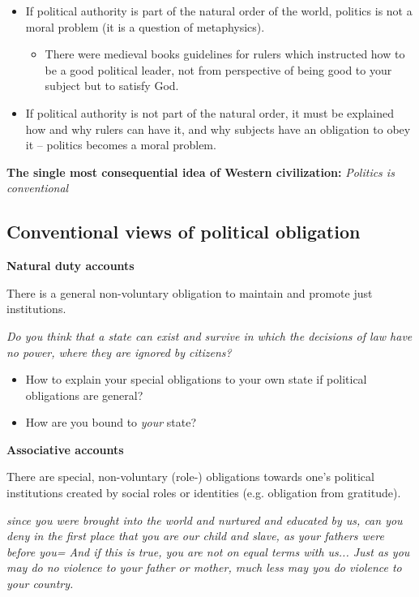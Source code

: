 \begin{itemize}
    \item If political authority is part of the natural order of the world,
    politics is not a moral problem (it is a question of metaphysics).
    \begin{itemize}
        \item There were medieval books guidelines for rulers which instructed
        how to be a good political leader, not from perspective of being good
        to your subject but to satisfy God.
    \end{itemize}
    \item If political authority is not part of the natural order, it must be
    explained how and why rulers can have it, and why subjects have an 
    obligation to obey it -- politics becomes a moral problem.
\end{itemize}

\textbf{The single most consequential idea of Western civilization:}
\textit{Politics is conventional}

\subsection{Conventional views of political obligation}

\textbf{Natural duty accounts}

There is a general non-voluntary obligation to maintain and promote just
institutions.

\textit{Do you think that a state can exist and survive in which the
decisions of law have no power, where they are ignored by citizens?}

\begin{itemize}
    \item How to explain your special obligations to your own state if
    political obligations are general?
    \item How are you bound to \textit{your} state?
\end{itemize}

\textbf{Associative accounts}

There are special, non-voluntary (role-) obligations towards one's political
institutions created by social roles or identities (e.g. obligation from
gratitude).

\textit{since you were brought into the world and nurtured and educated by
us, can you deny in the first place that you are our child and slave, as
your fathers were before you= And if this is true, you are not on equal terms
with us... Just as you may do no violence to your father or mother, much less
may you do violence to your country.}


